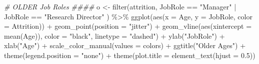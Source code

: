 \documentclass[
]{article}
\newenvironment{Shaded}{\begin{snugshade}}{\end{snugshade}}
\newcommand{\AttributeTok}[1]{\textcolor[rgb]{0.77,0.63,0.00}{#1}}
\newcommand{\CommentTok}[1]{\textcolor[rgb]{0.56,0.35,0.01}{\textit{#1}}}
\newcommand{\FloatTok}[1]{\textcolor[rgb]{0.00,0.00,0.81}{#1}}
\newcommand{\FunctionTok}[1]{\textcolor[rgb]{0.00,0.00,0.00}{#1}}
\newcommand{\NormalTok}[1]{#1}
\newcommand{\OtherTok}[1]{\textcolor[rgb]{0.56,0.35,0.01}{#1}}
\newcommand{\SpecialCharTok}[1]{\textcolor[rgb]{0.00,0.00,0.00}{#1}}
\newcommand{\StringTok}[1]{\textcolor[rgb]{0.31,0.60,0.02}{#1}}
\begin{document}
\begin{Shaded}
\begin{Highlighting}[]
\CommentTok{\# OLDER Job Roles \#\#\#\#}
\NormalTok{o }\OtherTok{\textless{}{-}} \FunctionTok{filter}\NormalTok{(attrition, JobRole }\SpecialCharTok{==} \StringTok{"Manager"} \SpecialCharTok{|}\NormalTok{ JobRole }\SpecialCharTok{==} \StringTok{"Research Director"}\NormalTok{ ) }\SpecialCharTok{\%\textgreater{}\%}
  \FunctionTok{ggplot}\NormalTok{(}\FunctionTok{aes}\NormalTok{(}\AttributeTok{x =}\NormalTok{ Age, }\AttributeTok{y =}\NormalTok{ JobRole, }\AttributeTok{color =}\NormalTok{ Attrition)) }\SpecialCharTok{+}
  \FunctionTok{geom\_point}\NormalTok{(}\AttributeTok{position =} \StringTok{"jitter"}\NormalTok{) }\SpecialCharTok{+}
  \FunctionTok{geom\_vline}\NormalTok{(}\FunctionTok{aes}\NormalTok{(}\AttributeTok{xintercept =} \FunctionTok{mean}\NormalTok{(Age)), }\AttributeTok{color =} \StringTok{"black"}\NormalTok{, }\AttributeTok{linetype =} \StringTok{"dashed"}\NormalTok{) }\SpecialCharTok{+}
  \FunctionTok{ylab}\NormalTok{(}\StringTok{"JobRole"}\NormalTok{) }\SpecialCharTok{+}
  \FunctionTok{xlab}\NormalTok{(}\StringTok{"Age"}\NormalTok{) }\SpecialCharTok{+}
  \FunctionTok{scale\_color\_manual}\NormalTok{(}\AttributeTok{values =}\NormalTok{ colors) }\SpecialCharTok{+}
  \FunctionTok{ggtitle}\NormalTok{(}\StringTok{"Older Ages"}\NormalTok{) }\SpecialCharTok{+}
  \FunctionTok{theme}\NormalTok{(}\AttributeTok{legend.position =} \StringTok{"none"}\NormalTok{) }\SpecialCharTok{+}
  \FunctionTok{theme}\NormalTok{(}\AttributeTok{plot.title =} \FunctionTok{element\_text}\NormalTok{(}\AttributeTok{hjust =} \FloatTok{0.5}\NormalTok{)) }



\end{Highlighting}
\end{Shaded}
\end{document}
